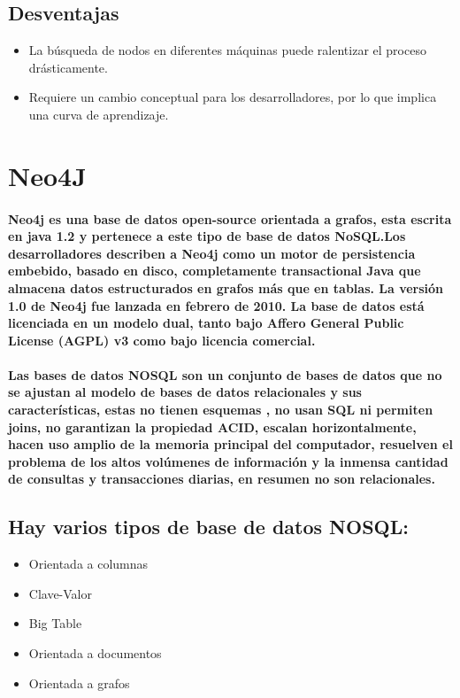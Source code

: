 \subsection{Desventajas} 
\begin{itemize}
  \item La búsqueda de nodos en diferentes máquinas puede ralentizar el proceso drásticamente.
  \item Requiere un cambio conceptual para los desarrolladores, por lo que implica una curva de aprendizaje.
\end{itemize}   

\section{Neo4J}
\paragraph{Neo4j es una base de datos open-source orientada a grafos, esta escrita en java 1.2 y pertenece a este tipo de base de datos NoSQL.Los desarrolladores describen a Neo4j como un motor de persistencia embebido, basado en disco, completamente transactional Java que almacena datos estructurados en grafos más que en tablas. La versión 1.0 de Neo4j fue lanzada en febrero de 2010. La base de datos está licenciada en un modelo dual, tanto bajo Affero General Public License (AGPL) v3 como bajo licencia comercial.}
\paragraph{Las bases de datos NOSQL son un conjunto de bases de datos que no se ajustan al modelo de bases de datos relacionales y sus características, estas no tienen esquemas  , no usan SQL ni permiten joins, no garantizan la propiedad ACID,  escalan horizontalmente, hacen uso amplio de la memoria principal del computador, resuelven el problema de los altos volúmenes de información y la inmensa cantidad de consultas y transacciones diarias, en resumen no son relacionales.}
\subsection{Hay varios tipos de base de datos NOSQL:}
\begin{itemize}
	\item Orientada a columnas
	\item Clave-Valor
	\item Big Table
	\item Orientada a documentos
	\item Orientada a grafos
\end{itemize}
